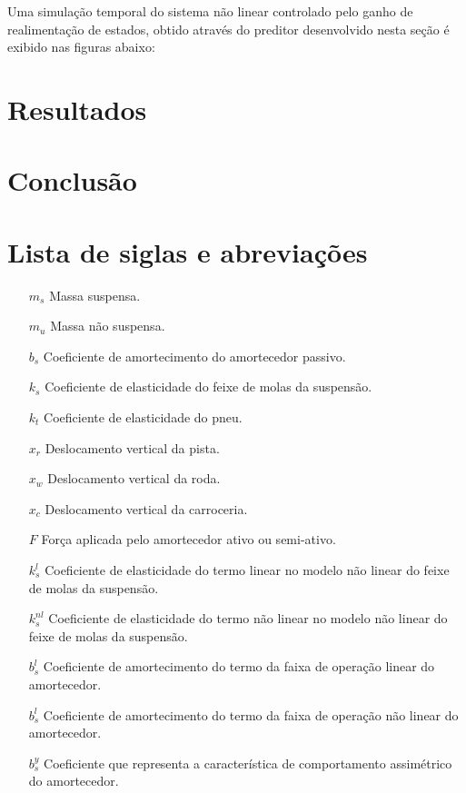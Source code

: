 \documentclass[a4paper]{ifacconf}
\begin{document}
    Uma simulação temporal do sistema não linear controlado pelo ganho de realimentação de estados, obtido através do preditor desenvolvido nesta seção é exibido nas figuras abaixo:

    \section{Resultados}
    \section{Conclusão}
    
    
    
    \appendix
    \section{Lista de siglas e abreviações}
    \begin{itemize} 
        \item [$m_s$] Massa suspensa.
        \item [$m_u$] Massa não suspensa.
        \item [$b_s$] Coeficiente de amortecimento do amortecedor passivo. 
        \item [$k_s$] Coeficiente de elasticidade do feixe de molas da suspensão.
        \item [$k_t$] Coeficiente de elasticidade do pneu.
        \item [$x_r$] Deslocamento vertical da pista.
        \item [$x_w$] Deslocamento vertical da roda.
        \item [$x_c$] Deslocamento vertical da carroceria.
        \item [$F$] Força aplicada pelo amortecedor ativo ou semi-ativo.
        \item [$k^{l}_{s}$] Coeficiente de elasticidade do termo linear no modelo não linear do feixe de molas da suspensão.
        \item [$k^{nl}_{s}$] Coeficiente de elasticidade do termo não linear no modelo não linear do feixe de molas da suspensão.
        \item [$b^{l}_{s}$] Coeficiente de amortecimento do termo da faixa de operação linear do amortecedor.
        \item [$b^{l}_{s}$] Coeficiente de amortecimento do termo da faixa de operação não linear do amortecedor.
        \item [$b^{y}_{s}$] Coeficiente que representa a característica  de comportamento assimétrico do amortecedor.
    \end{itemize}
    
\end{document}
